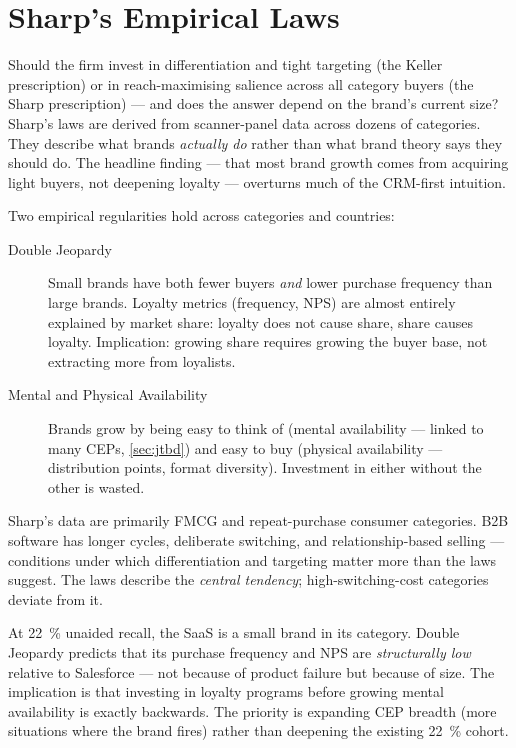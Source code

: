 \section{Sharp's Empirical Laws}\label{sec:sharp}

Should the firm invest in differentiation and tight targeting (the Keller prescription) or in reach-maximising salience across all category buyers (the Sharp prescription) --- and does the answer depend on the brand's current size? Sharp's laws are derived from scanner-panel data across dozens of categories. They describe what brands \emph{actually do} rather than what brand theory says they should do. The headline finding --- that most brand growth comes from acquiring light buyers, not deepening loyalty --- overturns much of the CRM-first intuition.

Two empirical regularities hold across categories and countries:

\begin{description}
  \item[Double Jeopardy] Small brands have both fewer buyers \emph{and} lower purchase frequency than large brands. Loyalty metrics (frequency, NPS) are almost entirely explained by market share: loyalty does not cause share, share causes loyalty. Implication: growing share requires growing the buyer base, not extracting more from loyalists.
  \item[Mental and Physical Availability] Brands grow by being easy to think of (mental availability --- linked to many CEPs, \cref{sec:jtbd}) and easy to buy (physical availability --- distribution points, format diversity). Investment in either without the other is wasted.
\end{description}

Sharp's data are primarily FMCG and repeat-purchase consumer categories. B2B software has longer cycles, deliberate switching, and relationship-based selling --- conditions under which differentiation and targeting matter more than the laws suggest. The laws describe the \emph{central tendency}; high-switching-cost categories deviate from it.

\begin{example}
At \qty{22}{\percent} unaided recall, the SaaS is a small brand in its category. Double Jeopardy predicts that its purchase frequency and NPS are \emph{structurally low} relative to Salesforce --- not because of product failure but because of size. The implication is that investing in loyalty programs before growing mental availability is exactly backwards. The priority is expanding CEP breadth (more situations where the brand fires) rather than deepening the existing \qty{22}{\percent} cohort.
\end{example}

